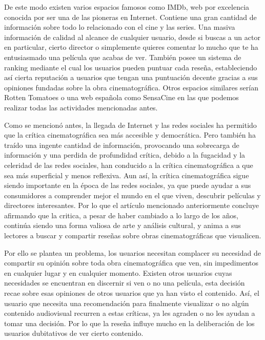 De este modo existen varios espacios famosos como IMDb\cite{IMDbWeb}, web por excelencia conocida por 
ser una de las pioneras en Internet. Contiene una gran cantidad de información sobre todo lo 
relacionado con el cine y las series. Una masiva información de calidad al alcance de cualquier 
usuario, desde si buscas a un actor en particular, cierto director o simplemente quieres comentar lo 
mucho que te ha entusiasmado una película que acabas de ver. También posee un sistema de ranking 
mediante el cual los usuarios pueden puntuar cada reseña, estableciendo así cierta reputación a 
usuarios que tengan una puntuación decente gracias a sus opiniones fundadas sobre la obra 
cinematográfica. Otros espacios similares serían Rotten Tomatoes\cite{RottenTWeb} o una web española 
como SensaCine\cite{SSweb} en las que podemos realizar todas las actividades mencionadas antes.

Como se mencionó antes, la llegada de Internet y las redes sociales ha permitido que la crítica 
cinematográfica sea más accesible y democrática. Pero también ha traído una ingente cantidad de 
información, provocando una sobrecarga de información y una perdida de profundidad crítica, debido a la 
fugacidad y la celeridad de las redes sociales, han conducido a la crítica cinematográfica a que sea 
más superficial y menos reflexiva. Aun así, la crítica cinematográfica sigue siendo importante en la 
época de las redes sociales, ya que puede ayudar a sus consumidores a comprender mejor el mundo en el 
que viven, descubrir películas y directores interesantes. Por lo que el artículo mencionado 
anteriormente concluye afirmando que la critica, a pesar de haber cambiado a lo largo de los años, 
continúa siendo una forma valiosa de arte y análisis cultural, y anima a sus lectores a buscar y 
compartir reseñas sobre obras cinematográficas que visualicen.

Por ello se plantea un problema, los usuarios necesitan complacer su necesidad de compartir su opinión 
sobre toda obra cinematográfica que ven, sin impedimentos en cualquier lugar y en cualquier momento. 
Existen otros usuarios cuyas necesidades se encuentran en discernir si ven o no una película, esta 
decisión recae sobre esas opiniones de otros usuarios que ya han visto el contenido. Así, el usuario 
que necesita una recomendación para finalmente visualizar o no algún contenido audiovisual recurren a 
estas críticas, ya les agraden o no les ayudan a tomar una decisión. Por lo que la reseña influye mucho 
en la deliberación de los usuarios dubitativos de ver cierto contenido.

